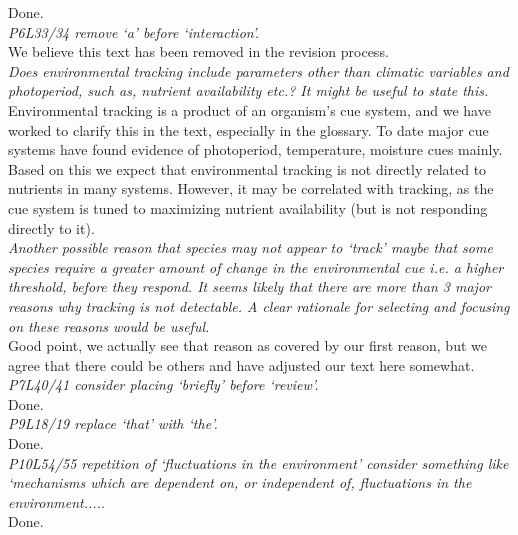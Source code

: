 \documentclass[11pt]{article}
\begin{document}
Done.\\

\emph{P6L33/34 remove `a' before `interaction'.}\\

We believe this text has been removed in the revision process.\\

\emph{Does environmental tracking include parameters other than climatic variables and photoperiod,
such as, nutrient availability etc.? It might be useful to state this.}\\

Environmental tracking is a product of an organism's cue system, and we have worked to clarify this in the text, especially in the glossary. To date major cue systems have found evidence of photoperiod, temperature, moisture cues mainly. Based on this we expect that environmental tracking is not directly related to nutrients in many systems. However, it may be correlated with tracking, as the cue system is tuned to maximizing nutrient availability (but is not responding directly to it).  \\

\emph{Another possible reason that species may not appear to `track' maybe that some species
require a greater amount of change in the environmental cue i.e. a higher threshold, before they respond. It seems likely that there are more than 3 major reasons why tracking is not detectable. A clear rationale for selecting and focusing on these reasons would be useful.}\\

Good point, we actually see that reason as covered by our first reason, but we agree that there could be others and have adjusted our text here somewhat. \\

\emph{P7L40/41 consider placing `briefly' before `review'.}\\

Done.\\

\emph{P9L18/19 replace `that' with `the'.}\\

Done.\\

\emph{P10L54/55 repetition of `fluctuations in the environment' consider something like `mechanisms
which are dependent on, or independent of, fluctuations in the environment.....}\\

Done.\\
\end{document}
